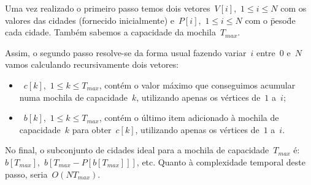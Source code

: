 \documentclass[12pt,a4paper,reqno]{report}
\numberwithin{figure}{section}
\numberwithin{equation}{section}
\begin{document}
Uma vez realizado o primeiro passo temos dois vetores~$V[i]$,~$1 \leq i \leq N$ com os valores das cidades (fornecido inicialmente) e~$P[i]$,~$1 \leq i \leq N$ com o \"peso\" de cada cidade. Também sabemos a capacidade da mochila~$T_{max}$. 

Assim, o segundo passo resolve-se da forma usual fazendo variar~$i$ entre~$0$ e~$N$ vamos calculando recursivamente dois vetores:
\begin{itemize}
	\item~$c[k]$,~$1 \leq k \leq T_{max}$, contém o valor máximo que conseguimos acumular numa mochila de capacidade~$k$, utilizando apenas os vértices de~$1$ a~$i$;
	\item~$b[k]$,~$1 \leq k \leq T_{max}$, contém o último item adicionado à mochila de capacidade~$k$ para obter~$c[k]$, utilizando apenas os vértices de~$1$ a~$i$.
\end{itemize}

No final, o subconjunto de cidades ideal para a mochila de capacidade~$T_{max}$ é:~$b[T_{max}]$,~$b[T_{max}-P[b[T_{max}]]]$, etc. Quanto à complexidade temporal deste passo, seria~$O(NT_{max})$.
\end{document}
